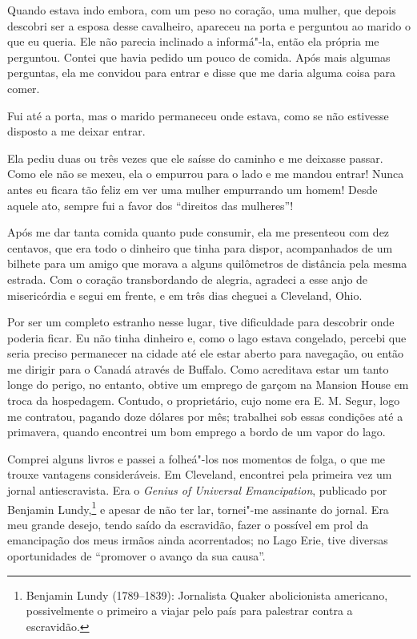 Quando estava indo embora, com um peso no coração, uma mulher, que
depois descobri ser a esposa desse cavalheiro, apareceu na porta e
perguntou ao marido o que eu queria. Ele não parecia inclinado a
informá"-la, então ela própria me perguntou. Contei que havia pedido um
pouco de comida. Após mais algumas perguntas, ela me convidou para
entrar e disse que me daria alguma coisa para comer.

Fui até a porta, mas o marido permaneceu onde estava, como se não
estivesse disposto a me deixar entrar.

Ela pediu duas ou três vezes que ele saísse do caminho e me deixasse
passar. Como ele não se mexeu, ela o empurrou para o lado e me mandou
entrar! Nunca antes eu ficara tão feliz em ver uma mulher empurrando um
homem! Desde aquele ato, sempre fui a favor dos ``direitos das
mulheres''!

Após me dar tanta comida quanto pude consumir, ela me presenteou com dez
centavos, que era todo o dinheiro que tinha para dispor, acompanhados de
um bilhete para um amigo que morava a alguns quilômetros de distância
pela mesma estrada. Com o coração transbordando de alegria, agradeci a
esse anjo de misericórdia e segui em frente, e em três dias cheguei a
Cleveland, Ohio.

Por ser um completo estranho nesse lugar, tive dificuldade para
descobrir onde poderia ficar. Eu não tinha dinheiro e, como o lago
estava congelado, percebi que seria preciso permanecer na cidade até ele
estar aberto para navegação, ou então me dirigir para o Canadá através
de Buffalo. Como acreditava estar um tanto longe do perigo, no entanto,
obtive um emprego de garçom na Mansion House em troca da hospedagem.
Contudo, o proprietário, cujo nome era E. M. Segur, logo me contratou,
pagando doze dólares por mês; trabalhei sob essas condições até a
primavera, quando encontrei um bom emprego a bordo de um vapor do lago.

Comprei alguns livros e passei a folheá"-los nos momentos de folga, o que
me trouxe vantagens consideráveis. Em Cleveland, encontrei pela primeira
vez um jornal antiescravista. Era o \emph{Genius of Universal
Emancipation}, publicado por Benjamin Lundy,\footnote{Benjamin Lundy
  (1789--1839): Jornalista Quaker abolicionista americano, possivelmente
  o primeiro a viajar pelo país para palestrar contra a escravidão.} e
apesar de não ter lar, tornei"-me assinante do jornal. Era meu grande
desejo, tendo saído da escravidão, fazer o possível em prol da
emancipação dos meus irmãos ainda acorrentados; no Lago Erie, tive
diversas oportunidades de ``promover o avanço da sua causa''.


